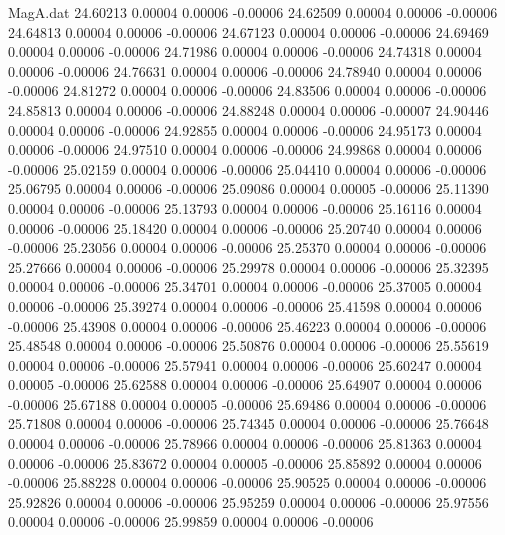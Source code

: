 \begin{filecontents}{MagA.dat}
  24.60213    0.00004    0.00006   -0.00006
  24.62509    0.00004    0.00006   -0.00006
  24.64813    0.00004    0.00006   -0.00006
  24.67123    0.00004    0.00006   -0.00006
  24.69469    0.00004    0.00006   -0.00006
  24.71986    0.00004    0.00006   -0.00006
  24.74318    0.00004    0.00006   -0.00006
  24.76631    0.00004    0.00006   -0.00006
  24.78940    0.00004    0.00006   -0.00006
  24.81272    0.00004    0.00006   -0.00006
  24.83506    0.00004    0.00006   -0.00006
  24.85813    0.00004    0.00006   -0.00006
  24.88248    0.00004    0.00006   -0.00007
  24.90446    0.00004    0.00006   -0.00006
  24.92855    0.00004    0.00006   -0.00006
  24.95173    0.00004    0.00006   -0.00006
  24.97510    0.00004    0.00006   -0.00006
  24.99868    0.00004    0.00006   -0.00006
  25.02159    0.00004    0.00006   -0.00006
  25.04410    0.00004    0.00006   -0.00006
  25.06795    0.00004    0.00006   -0.00006
  25.09086    0.00004    0.00005   -0.00006
  25.11390    0.00004    0.00006   -0.00006
  25.13793    0.00004    0.00006   -0.00006
  25.16116    0.00004    0.00006   -0.00006
  25.18420    0.00004    0.00006   -0.00006
  25.20740    0.00004    0.00006   -0.00006
  25.23056    0.00004    0.00006   -0.00006
  25.25370    0.00004    0.00006   -0.00006
  25.27666    0.00004    0.00006   -0.00006
  25.29978    0.00004    0.00006   -0.00006
  25.32395    0.00004    0.00006   -0.00006
  25.34701    0.00004    0.00006   -0.00006
  25.37005    0.00004    0.00006   -0.00006
  25.39274    0.00004    0.00006   -0.00006
  25.41598    0.00004    0.00006   -0.00006
  25.43908    0.00004    0.00006   -0.00006
  25.46223    0.00004    0.00006   -0.00006
  25.48548    0.00004    0.00006   -0.00006
  25.50876    0.00004    0.00006   -0.00006
  25.55619    0.00004    0.00006   -0.00006
  25.57941    0.00004    0.00006   -0.00006
  25.60247    0.00004    0.00005   -0.00006
  25.62588    0.00004    0.00006   -0.00006
  25.64907    0.00004    0.00006   -0.00006
  25.67188    0.00004    0.00005   -0.00006
  25.69486    0.00004    0.00006   -0.00006
  25.71808    0.00004    0.00006   -0.00006
  25.74345    0.00004    0.00006   -0.00006
  25.76648    0.00004    0.00006   -0.00006
  25.78966    0.00004    0.00006   -0.00006
  25.81363    0.00004    0.00006   -0.00006
  25.83672    0.00004    0.00005   -0.00006
  25.85892    0.00004    0.00006   -0.00006
  25.88228    0.00004    0.00006   -0.00006
  25.90525    0.00004    0.00006   -0.00006
  25.92826    0.00004    0.00006   -0.00006
  25.95259    0.00004    0.00006   -0.00006
  25.97556    0.00004    0.00006   -0.00006
  25.99859    0.00004    0.00006   -0.00006

\end{filecontents}
